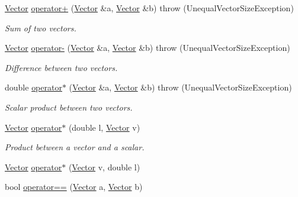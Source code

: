 \begin{CompactItemize}
\item 
\hyperlink{classgrassmann_1_1Vector}{Vector} \hyperlink{classgrassmann_1_1Vector_802964ed6ee76e3b82662c7b0bfa251a}{operator+} (\hyperlink{classgrassmann_1_1Vector}{Vector} \&a, \hyperlink{classgrassmann_1_1Vector}{Vector} \&b)  throw (UnequalVectorSizeException)
\begin{CompactList}\small\item\em Sum of two vectors. \item\end{CompactList}\item 
\hyperlink{classgrassmann_1_1Vector}{Vector} \hyperlink{classgrassmann_1_1Vector_ac3997b0f5002019c4373e8f9005f85b}{operator-} (\hyperlink{classgrassmann_1_1Vector}{Vector} \&a, \hyperlink{classgrassmann_1_1Vector}{Vector} \&b)  throw (UnequalVectorSizeException)
\begin{CompactList}\small\item\em Difference between two vectors. \item\end{CompactList}\item 
double \hyperlink{classgrassmann_1_1Vector_cd40ad4e72bc86ac3fbf725cf8184d2d}{operator$\ast$} (\hyperlink{classgrassmann_1_1Vector}{Vector} \&a, \hyperlink{classgrassmann_1_1Vector}{Vector} \&b)  throw (UnequalVectorSizeException)
\begin{CompactList}\small\item\em Scalar product between two vectors. \item\end{CompactList}\item 
\hyperlink{classgrassmann_1_1Vector}{Vector} \hyperlink{classgrassmann_1_1Vector_e5f388dfbc55ca5afce80591fbfdcd67}{operator$\ast$} (double l, \hyperlink{classgrassmann_1_1Vector}{Vector} v)
\begin{CompactList}\small\item\em Product between a vector and a scalar. \item\end{CompactList}\item 
\hyperlink{classgrassmann_1_1Vector}{Vector} \hyperlink{classgrassmann_1_1Vector_0b7d545365b106c4a84d6970964ab56c}{operator$\ast$} (\hyperlink{classgrassmann_1_1Vector}{Vector} v, double l)
\item 
bool \hyperlink{classgrassmann_1_1Vector_5d46747ad1ba11f461f4db8945e9bedf}{operator==} (\hyperlink{classgrassmann_1_1Vector}{Vector} a, \hyperlink{classgrassmann_1_1Vector}{Vector} b)

\end{CompactItemize}
